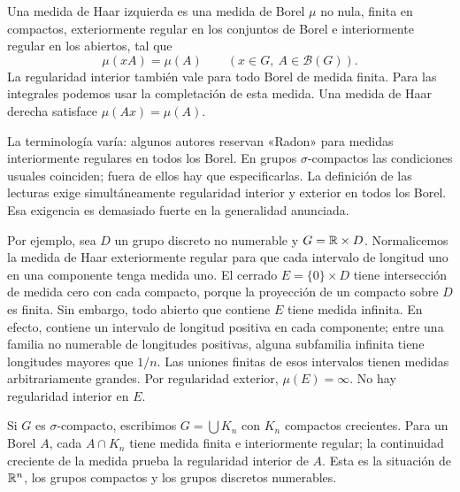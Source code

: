 \begin{definicion}\label{v4:haar-def}
Una medida de Haar izquierda es una medida de Borel $\mu$ no nula, finita en compactos, exteriormente regular en los conjuntos de Borel e interiormente regular en los abiertos, tal que
\[
 \mu(xA)=\mu(A)\qquad(x\in G,\ A\in\mathcal B(G)).
\]
La regularidad interior también vale para todo Borel de medida finita. Para las integrales podemos usar la completación de esta medida. Una medida de Haar derecha satisface $\mu(Ax)=\mu(A)$.
\end{definicion}
\begin{observacion}\label{v4:haar-radon}
La terminología varía: algunos autores reservan «Radon» para medidas interiormente regulares en todos los Borel. En grupos $\sigma$-compactos las condiciones usuales coinciden; fuera de ellos hay que especificarlas. La definición de las lecturas exige simultáneamente regularidad interior y exterior en todos los Borel. Esa exigencia es demasiado fuerte en la generalidad anunciada.

Por ejemplo, sea $D$ un grupo discreto no numerable y $G=\mathbb R\times D$. Normalicemos la medida de Haar exteriormente regular para que cada intervalo de longitud uno en una componente tenga medida uno. El cerrado $E=\{0\}\times D$ tiene intersección de medida cero con cada compacto, porque la proyección de un compacto sobre $D$ es finita. Sin embargo, todo abierto que contiene $E$ tiene medida infinita. En efecto, contiene un intervalo de longitud positiva en cada componente; entre una familia no numerable de longitudes positivas, alguna subfamilia infinita tiene longitudes mayores que $1/n$. Las uniones finitas de esos intervalos tienen medidas arbitrariamente grandes. Por regularidad exterior, $\mu(E)=\infty$. No hay regularidad interior en $E$.

Si $G$ es $\sigma$-compacto, escribimos $G=\bigcup K_n$ con $K_n$ compactos crecientes. Para un Borel $A$, cada $A\cap K_n$ tiene medida finita e interiormente regular; la continuidad creciente de la medida prueba la regularidad interior de $A$. Esta es la situación de $\mathbb R^n$, los grupos compactos y los grupos discretos numerables.
\end{observacion}

